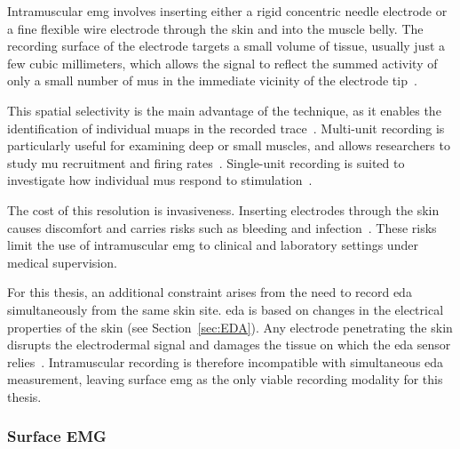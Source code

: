 Intramuscular \gls{emg} involves inserting either a rigid concentric needle electrode or a fine flexible wire electrode through the skin and into the muscle belly. The recording surface of the electrode targets a small volume of tissue, usually just a few cubic millimeters, which allows the signal to reflect the summed activity of only a small number of \glspl{mu} in the immediate vicinity of the electrode tip~\cite{kamen_essentials_2010, karacan_comparison_2025}.

This spatial selectivity is the main advantage of the technique, as it enables the identification of individual \glspl{muap} in the recorded trace~\cite{kamen_essentials_2010}. Multi-unit recording is particularly useful for examining deep or small muscles, and allows researchers to study \gls{mu} recruitment and firing rates~\cite{karacan_comparison_2025}. Single-unit recording is suited to investigate how individual \glspl{mu} respond to stimulation~\cite{karacan_comparison_2025}.

The cost of this resolution is invasiveness. Inserting electrodes through the skin causes discomfort and carries risks such as bleeding and infection~\cite{whittaker_fundamentals_2012, karacan_comparison_2025}. These risks limit the use of intramuscular \gls{emg} to clinical and laboratory settings under medical supervision.

For this thesis, an additional constraint arises from the need to record \gls{eda} simultaneously from the same skin site. \Gls{eda} is based on changes in the electrical properties of the skin (see Section~\ref{sec:EDA}). Any electrode penetrating the skin disrupts the electrodermal signal and damages the tissue on which the \gls{eda} sensor relies~\cite{boucsein_electrodermal_2012}. Intramuscular recording is therefore incompatible with simultaneous \gls{eda} measurement, leaving surface \gls{emg} as the only viable recording modality for this thesis.


\subsubsection{Surface EMG} \label{sec:sEMG}

